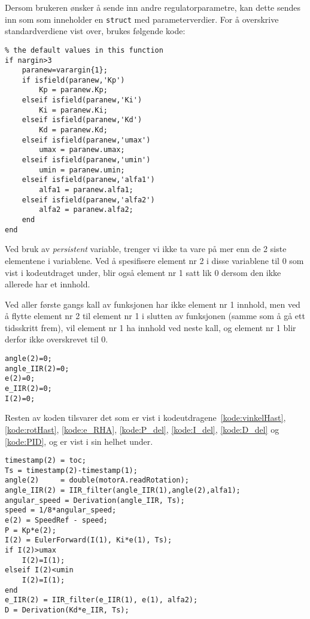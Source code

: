 Dersom brukeren ønsker å sende inn andre regulatorparametre, kan dette
sendes inn som  som inneholder en {\tt struct} med
parameterverdier. For å overskrive standardverdiene vist over, brukes
følgende kode:
\begin{lstlisting}[caption=Kode fra funksjonen for turtallsregulering av motor A.,
  label=kode:para, firstnumber=31]
  % If you have specified some parameters in main file, they will overwrite
% the default values in this function
if nargin>3
    paranew=varargin{1};     
    if isfield(paranew,'Kp')
        Kp = paranew.Kp;
    elseif isfield(paranew,'Ki')
        Ki = paranew.Ki;
    elseif isfield(paranew,'Kd')
        Kd = paranew.Kd; 
    elseif isfield(paranew,'umax')
        umax = paranew.umax; 
    elseif isfield(paranew,'umin')
        umin = paranew.umin; 
    elseif isfield(paranew,'alfa1')
        alfa1 = paranew.alfa1; 
    elseif isfield(paranew,'alfa2')
        alfa2 = paranew.alfa2; 
    end
end
\end{lstlisting}

Ved bruk av {\it persistent} variable, trenger vi ikke ta vare på
mer enn de  2 siste
elementene i variablene. Ved å spesifisere element nr 2 i disse
variablene til 0 som vist i kodeutdraget under,
blir også element nr 1 satt lik 0 dersom den ikke
allerede har et innhold.

Ved aller første gangs kall av funksjonen har
ikke element nr 1 innhold, men ved å flytte element nr 2 til element
nr 1 i slutten av funksjonen (samme som å gå ett tidsskritt frem),
vil element nr 1 ha innhold ved neste
kall, og element nr 1 blir derfor ikke overskrevet til 0.

\begin{lstlisting}[caption=Kode fra funksjonen for turtallsregulering av motor A.,
  label=kode:resten, firstnumber=31]
angle(2)=0;
angle_IIR(2)=0;
e(2)=0;
e_IIR(2)=0;
I(2)=0;
\end{lstlisting}

Resten av koden tilsvarer det som er vist  i
kodeutdragene~\ref{kode:vinkelHast}, \ref{kode:rotHast},
\ref{kode:e_RHA}, \ref{kode:P_del}, \ref{kode:I_del},
\ref{kode:D_del} og \ref{kode:PID}, og er vist i sin helhet under.
\begin{lstlisting}[caption=Kode fra funksjonen for turtallsregulering av motor A.,
  label=kode:resten2, firstnumber=31]
timestamp(2) = toc;
Ts = timestamp(2)-timestamp(1); 
angle(2)     = double(motorA.readRotation);
angle_IIR(2) = IIR_filter(angle_IIR(1),angle(2),alfa1);
angular_speed = Derivation(angle_IIR, Ts);
speed = 1/8*angular_speed;
e(2) = SpeedRef - speed;
P = Kp*e(2);
I(2) = EulerForward(I(1), Ki*e(1), Ts);
if I(2)>umax
    I(2)=I(1);
elseif I(2)<umin
    I(2)=I(1);
end
e_IIR(2) = IIR_filter(e_IIR(1), e(1), alfa2);
D = Derivation(Kd*e_IIR, Ts);
\end{lstlisting}

